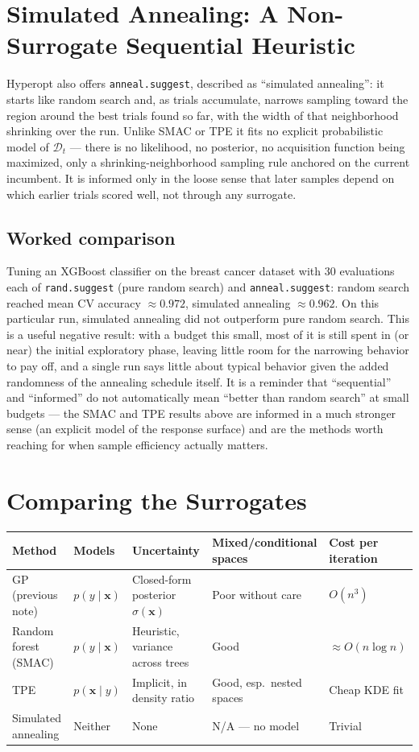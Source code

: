 \documentclass[conference]{IEEEtran}
\begin{document}
\section*{Simulated Annealing: A Non-Surrogate Sequential Heuristic}
Hyperopt also offers \texttt{anneal.suggest}, described as ``simulated annealing'': it starts like random search and, as trials accumulate, narrows sampling toward the region around the best trials found so far, with the width of that neighborhood shrinking over the run. Unlike SMAC or TPE it fits no explicit probabilistic model of $\mathcal{D}_t$ --- there is no likelihood, no posterior, no acquisition function being maximized, only a shrinking-neighborhood sampling rule anchored on the current incumbent. It is informed only in the loose sense that later samples depend on which earlier trials scored well, not through any surrogate.

\subsection*{Worked comparison}
Tuning an XGBoost classifier on the breast cancer dataset with 30 evaluations each of \texttt{rand.suggest} (pure random search) and \texttt{anneal.suggest}: random search reached mean CV accuracy $\approx 0.972$, simulated annealing $\approx 0.962$. On this particular run, simulated annealing did not outperform pure random search. This is a useful negative result: with a budget this small, most of it is still spent in (or near) the initial exploratory phase, leaving little room for the narrowing behavior to pay off, and a single run says little about typical behavior given the added randomness of the annealing schedule itself. It is a reminder that ``sequential'' and ``informed'' do not automatically mean ``better than random search'' at small budgets --- the SMAC and TPE results above are informed in a much stronger sense (an explicit model of the response surface) and are the methods worth reaching for when sample efficiency actually matters.

\section*{Comparing the Surrogates}
\begin{center}
\footnotesize
\begin{tabular}{@{}lllll@{}}
\toprule
Method & Models & Uncertainty & Mixed/conditional spaces & Cost per iteration \\
\midrule
GP (previous note) & $p(y\mid\mathbf{x})$ & Closed-form posterior $\sigma(\mathbf{x})$ & Poor without care & $O(n^3)$ \\
Random forest (SMAC) & $p(y\mid\mathbf{x})$ & Heuristic, variance across trees & Good & $\approx O(n\log n)$ \\
TPE & $p(\mathbf{x}\mid y)$ & Implicit, in density ratio & Good, esp.\ nested spaces & Cheap KDE fit \\
Simulated annealing & Neither & None & N/A --- no model & Trivial \\
\bottomrule
\end{tabular}
\end{center}
\end{document}
